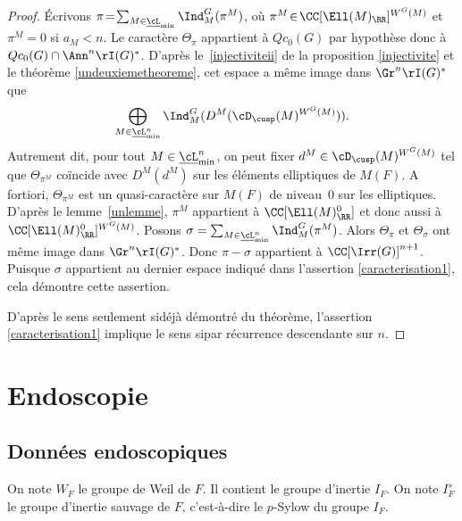 \begin{proof}
Écrivons $\pi\!=\!\sum_{M\in \underline{\cL}_{\min}}\Ind_{M}^G(\pi^M)$, où $\pi^M\!\in\!\CC[\Ell(M)_{\RR}]^{W^G(M)}$ et $\pi^M\!=\!0$ si $a_{M}\!<\!n$. Le caractère $\Theta_{\pi}$ appartient à $Qc_{0}(G)$ par hypothèse donc à $Qc_{0}(G)\cap \Ann^n\rI(G)^*$. D'après le~\eqref{injectiviteii} de la proposition \ref{injectivite} et le théorème \ref{undeuxiemetheoreme}, cet espace a même image dans $\Gr^n\rI(G)^*$ que
\[
\bigoplus_{M\in \underline{\cL}^n_{\min}}\Ind_{M}^G(D^M(\cD_{\cusp}(M)^{W^G(M)})).
\]
Autrement dit, pour tout $M\in \underline{\cL}^n_{\min}$, on peut fixer $d^M\in \cD_{\cusp}(M)^{W^G(M)}$ tel que $\Theta_{\pi^M}$ coïncide avec $D^M(d^M)$ sur les éléments elliptiques de $M(F)$. A fortiori, $\Theta_{\pi^M}$ est un quasi-caractère sur $M(F)$ de niveau~$0$ sur les elliptiques. D'après le lemme~\ref{unlemme}, $\pi^M$ appartient à $\CC[\Ell(M)_{\RR}^0]$ et donc aussi à $\CC[\Ell(M)_{\RR}^0]^{W^G(M)}$. Posons
$\sigma=\sum_{M\in \underline{\cL}^n_{\min}}\Ind_{M}^G(\pi^M)$. Alors $\Theta_{\pi}$ et $\Theta_{\sigma}$ ont même image dans $\Gr^n\rI(G)^*$. Donc $\pi-\sigma$ appartient à $\CC[\Irr(G)]^{n+1}$. Puisque $\sigma$ appartient au dernier espace indiqué dans l'assertion \eqref{caracterisation1}, cela démontre cette assertion.

D'après le sens \og seulement si\fg déjà démontré du théorème, l'assertion \eqref{caracterisation1} implique le sens \og si\fg par récurrence descendante sur $n$.
\end{proof}

\section{Endoscopie}

\subsection{Données endoscopiques}\label{donneesendoscopiques}
On note $W_{F}$ le groupe de Weil de $F$. Il contient le groupe d'inertie $I_{F}$. On note $I_{F}^s$ le groupe d'inertie sauvage de $F$, c'est-à-dire le $p$-Sylow du groupe $I_{F}$.

